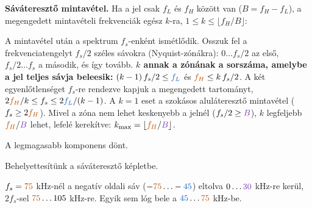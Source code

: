 \begin{elmelet}
\textbf{Sáváteresztő mintavétel.} Ha a jel csak $f_L$ és $f_H$ között van ($B=f_H-f_L$), a megengedett mintavételi frekvenciák egész $k$-ra, $1\le k\le\lfloor f_H/B\rfloor$:
\begin{center}\end{center}

\end{elmelet}

A mintavétel után a spektrum $f_s$-enként ismétlődik. Osszuk fel a frekvenciatengelyt $f_s/2$ széles sávokra (Nyquist-zónákra): $0\ldots f_s/2$ az első, $f_s/2\ldots f_s$ a második, és így tovább. \textbf{$k$ annak a zónának a sorszáma, amelybe a jel teljes sávja beleesik:} $(k-1)\,f_s/2\le {\ca{f_L}}$ és ${\cb{f_H}}\le k\,f_s/2$. A két egyenlőtlenséget $f_s$-re rendezve kapjuk a megengedett tartományt, $2{\cb{f_H}}/k\le f_s\le2{\ca{f_L}}/(k-1)$. A $k=1$ eset a szokásos aluláteresztő mintavétel ($f_s\ge2{\cb{f_H}}$). Mivel a zóna nem lehet keskenyebb a jelnél ($f_s/2\ge {\cc{B}}$), $k$ legfeljebb ${\cb{f_H}}/{\cc{B}}$ lehet, lefelé kerekítve: $k_{\max}=\lfloor {\cb{f_H}}/{\cc{B}}\rfloor$.

A legmagasabb komponens dönt.

\begin{center}\end{center}

Behelyettesítünk a sáváteresztő képletbe.

\begin{center}\end{center}

\begin{center}\end{center}

$f_s={\cb{75}}$ kHz-nél a negatív oldali sáv ($-{\cb{75}}\ldots-{\ca{45}}$) eltolva $0\ldots{\cc{30}}$ kHz-re kerül, $2f_s$-sel ${\cb{75}}\ldots105$ kHz-re. Egyik sem lóg bele a ${\ca{45}}\ldots{\cb{75}}$ kHz-be.


